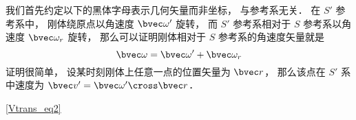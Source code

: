

我们首先约定以下的黑体字母表示几何矢量而非坐标， 与参考系无关． 在 $S'$ 参考系中， 刚体绕原点以角速度 $\bvec \omega'$ 旋转， 而 $S'$ 参考系相对于 $S$ 参考系以角速度 $\bvec \omega_r$ 旋转， 那么可以证明刚体相对于 $S$ 参考系的角速度矢量就是
\begin{equation}
\bvec \omega = \bvec \omega' + \bvec \omega_r
\end{equation}
证明很简单， 设某时刻刚体上任意一点的位置矢量为 $\bvec r$， 那么该点在 $S'$ 系中速度为 $\bvec v' = \bvec\omega'\cross\bvec r$． 

\autoref{Vtrans_eq2}~
